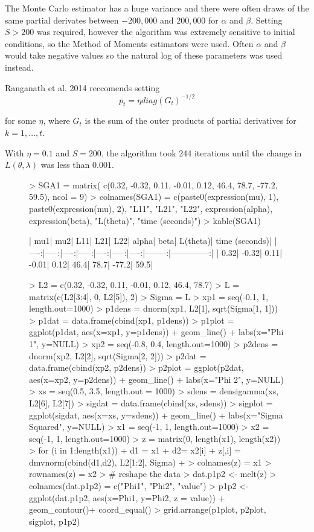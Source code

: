 \documentclass{article}
\begin{document}
The Monte Carlo estimator has a huge variance and there were often draws of the same partial derivates between $-200,000$ and $200,000$ for $\alpha$ and $\beta$. Setting $S > 200$ was required, however the algorithm was extremely sensitive to initial conditions, so the Method of Moments estimators were used. Often $\alpha$ and $\beta$ would take negative values so the natural log of these parameters was used instead.

Ranganath et al. 2014 reccomends setting 
$$p_t = \eta diag(G_t)^{-1/2}$$

for some $\eta$, where $G_t$ is the sum of the outer products of partial derivatives for $k = 1, \dots, t$.

With $\eta = 0.1$ and $S = 200$, the algorithm took 244 iterations until the change in $L(\theta, \lambda)$ was less than $0.001$.


\begin{figure}
\begin{Schunk}
\begin{Sinput}
> SGA1 = matrix( c(0.32, -0.32, 0.11, -0.01, 0.12, 46.4, 78.7, -77.2, 59.5), ncol = 9)
> colnames(SGA1) = c(paste0(expression(mu), 1), paste0(expression(mu), 2), "L11", "L21", "L22", expression(alpha), expression(beta), "L(theta)", "time (seconds)")
> kable(SGA1)
\end{Sinput}
\begin{Soutput}
|  mu1|   mu2|  L11|   L21|  L22| alpha| beta| L(theta)| time (seconds)|
|----:|-----:|----:|-----:|----:|-----:|----:|--------:|--------------:|
| 0.32| -0.32| 0.11| -0.01| 0.12|  46.4| 78.7|    -77.2|           59.5|
\end{Soutput}
\begin{Sinput}
> L2 =  c(0.32, -0.32, 0.11, -0.01, 0.12, 46.4, 78.7)
> L = matrix(c(L2[3:4], 0, L2[5]), 2)
> Sigma = L %*% t(L)
> xp1 = seq(-0.1, 1, length.out=1000)
> p1dens = dnorm(xp1, L2[1], sqrt(Sigma[1, 1]))
> p1dat = data.frame(cbind(xp1, p1dens))
> p1plot = ggplot(p1dat, aes(x=xp1, y=p1dens)) + geom_line() + labs(x="Phi 1", y=NULL)
> xp2 = seq(-0.8, 0.4, length.out=1000)
> p2dens = dnorm(xp2, L2[2], sqrt(Sigma[2, 2]))
> p2dat = data.frame(cbind(xp2, p2dens))
> p2plot = ggplot(p2dat, aes(x=xp2, y=p2dens)) + geom_line() + labs(x="Phi 2", y=NULL)
> xs = seq(0.5, 3.5, length.out = 1000)
> sdens = densigamma(xs, L2[6], L2[7])
> sigdat = data.frame(cbind(xs, sdens))
> sigplot = ggplot(sigdat, aes(x=xs, y=sdens)) + geom_line() + labs(x="Sigma Squared", y=NULL)
> x1 = seq(-1, 1, length.out=1000)
> x2 = seq(-1, 1, length.out=1000)
> z = matrix(0, length(x1), length(x2))
> for (i in 1:length(x1)) {
+   d1 = x1
+   d2= x2[i]
+   z[,i] = dmvnorm(cbind(d1,d2), L2[1:2], Sigma)
+ }
> colnames(z) = x1
> rownames(z) = x2
> # reshape the data
> dat.p1p2 <- melt(z)
> colnames(dat.p1p2) = c("Phi1", "Phi2", "value")
> p1p2 <- ggplot(dat.p1p2, aes(x=Phi1, y=Phi2, z = value)) + geom_contour()+ coord_equal()
> grid.arrange(p1plot, p2plot, sigplot, p1p2)
\end{Sinput}
\end{Schunk}
\end{figure}
\end{document}
